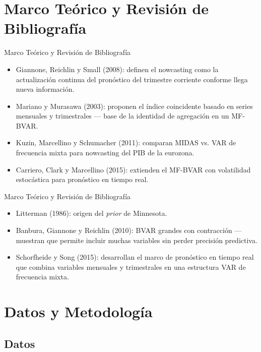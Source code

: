 \documentclass{beamer}
\begin{document}
\section{Marco Teórico y Revisión de Bibliografía}

\begin{frame}{Marco Teórico y Revisión de Bibliografía}{}
\begin{itemize}\justifying
	\item \textcolor[rgb]{0,0.58,0}{Giannone, Reichlin y Small (2008)}: definen el nowcasting como la actualización continua del pronóstico del trimestre corriente conforme llega nueva información.
	\item \textcolor[rgb]{0.92,0.5,0.4}{Mariano y Murasawa (2003)}: proponen el índice coincidente basado en series mensuales y trimestrales — base de la identidad de agregación en un MF-BVAR.
	\item \textcolor[rgb]{0.92,0.5,0.4}{Kuzin, Marcellino y Schumacher (2011)}: comparan MIDAS vs. VAR de frecuencia mixta para nowcasting del PIB de la eurozona.
	\item \textcolor[rgb]{0.92,0.5,0.4}{Carriero, Clark y Marcellino (2015)}: extienden el MF-BVAR con volatilidad estocástica para pronóstico en tiempo real.
\end{itemize}
\end{frame}

\begin{frame}{Marco Teórico y Revisión de Bibliografía}{}
\begin{itemize}\justifying
	\item \textcolor[rgb]{0,0,1}{Litterman (1986)}: origen del \textit{prior} de Minnesota.
	\item \textcolor[rgb]{0,0,1}{Banbura, Giannone y Reichlin (2010)}: BVAR grandes con contracción — muestran que permite incluir muchas variables sin perder precisión predictiva.
	\item \textcolor[rgb]{0.29,0,0.51}{Schorfheide y Song (2015)}: desarrollan el marco de pronóstico en tiempo real que combina variables mensuales y trimestrales en una estructura VAR de frecuencia mixta.
\end{itemize}
\end{frame}


\section{Datos y Metodología}

\subsection{Datos}
\end{document}
